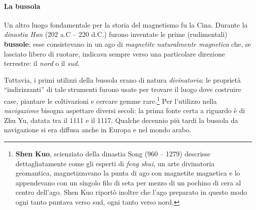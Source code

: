 \paragraph{La bussola}
Un altro luogo fondamentale per la storia del magnetismo fu la Cina. Durante la \textit{dinastia Han} (202 a.C – 220 d.C.) furono inventate le prime (rudimentali) \textbf{bussole}: esse consistevano in un ago di \textit{magnetite naturalmente magnetica} che, se lasciato libero di ruotare, indicava sempre verso una particolare direzione terrestre: il \textit{nord} o il \textit{sud}.

Tuttavia, i primi utilizzi della bussola erano di natura \textit{divinatoria}: le proprietà ``indirizzanti'' di tale strumenti furono usate per trovare il luogo dove costruire case, piantare le coltivazioni e cercare gemme rare.\footnote{\textbf{Shen Kuo}, scienziato della dinastia Song (960 – 1279) descrisse dettagliatamente come gli esperti di \textit{feng shui}, un arte divinatoria geomantica, magnetizzavano la punta di ago con magnetite magnetica e lo appendevano con un singolo filo di seta per mezzo di un pochino di cera al centro dell'ago. Shen Kuo riportò inoltre che l'ago preparato in questo modo ogni tanto puntava verso sud, ogni tanto verso nord.} Per l'utilizzo nella \textit{navigazione} bisogna aspettare diversi secoli: la prima fonte certa a riguardo è di Zhu Yu, datata tra il 1111 e il 1117. Qualche decennio più tardi la bussola da navigazione si era diffusa anche in Europa e nel mondo arabo.

